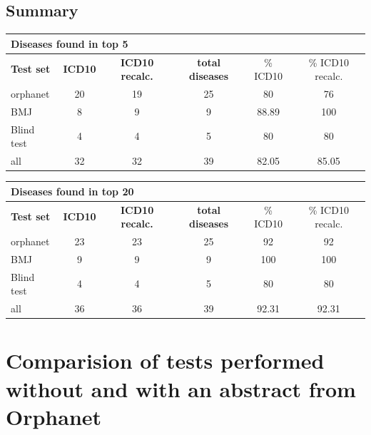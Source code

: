 \documentclass[10pt,letterpaper,final]{article}
\begin{document}
\subsection{Summary}
\label{app:summary_icd10_icd10recalc}

\begin{center}
\begin{small}
\begin{tabular}{l|cc||ccc}
	\multicolumn{6}{l}{\textbf{Diseases found in top 5}} \\ \hline
\textbf{Test set} & \textbf{ICD10} &	\textbf{ICD10 recalc.}	 &	\textbf{total diseases} &	\% ICD10 &\% ICD10 recalc. \\ \hline
orphanet    &     20  &  19    &     25  &   80   & 76 \\
BMJ	        &   8    &    9  &    9   &    88.89  & 100 \\
Blind test	&   4    &    4  &    5   &    80  & 80 \\ \hline \hline
all	        &   32    &   32   &   39    &   82.05   & 85.05 \\ \hline
\end{tabular}
\end{small}
\end{center}

\begin{center}
\begin{small}
\begin{tabular}{l|cc||ccc}
	\multicolumn{6}{l}{\textbf{Diseases found in top 20}} \\ \hline
\textbf{Test set} & \textbf{ICD10} &	\textbf{ICD10 recalc.}	 &	\textbf{total diseases} &	\% ICD10 &\% ICD10 recalc. \\ \hline
orphanet    &   23    &  23    &   25    &   92   & 92 \\
BMJ	        &    9   &   9   &     9  &   100   & 100 \\
Blind test	&    4   &   4   &    5   &   80   & 80 \\ \hline \hline
all	        &    36   &  36    &   39    &  92.31  & 92.31 \\ \hline
\end{tabular}
\end{small}
\end{center}



\newpage
\section{Comparision of tests performed without and with an abstract from Orphanet}
\end{document}
